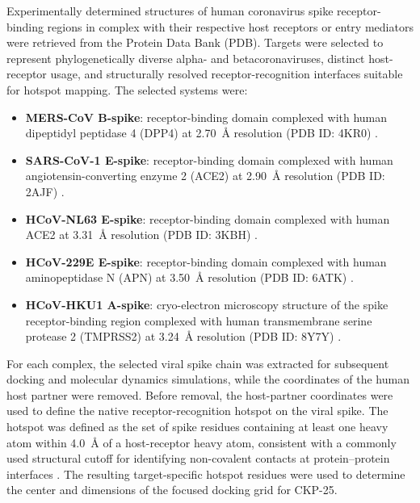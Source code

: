 \documentclass[pharmaceuticals,article,submit,pdftex,moreauthors]{Definitions/mdpi}
\begin{document}
Experimentally determined structures of human coronavirus spike receptor-binding regions in complex with their respective host receptors or entry mediators were retrieved from the Protein Data Bank (PDB). Targets were selected to represent phylogenetically diverse alpha- and betacoronaviruses, distinct host-receptor usage, and structurally resolved receptor-recognition interfaces suitable for hotspot mapping. The selected systems were:

\begin{itemize}
    \item \textbf{MERS-CoV B-spike}: receptor-binding domain complexed with human dipeptidyl peptidase 4 (DPP4) at 2.70~\AA{} resolution (PDB ID: 4KR0) \cite{lu2013molecular}.
    
    \item \textbf{SARS-CoV-1 E-spike}: receptor-binding domain complexed with human angiotensin-converting enzyme 2 (ACE2) at 2.90~\AA{} resolution (PDB ID: 2AJF) \cite{li2005structure}.
    
    \item \textbf{HCoV-NL63 E-spike}: receptor-binding domain complexed with human ACE2 at 3.31~\AA{} resolution (PDB ID: 3KBH) \cite{wu2009structure}.
    
    \item \textbf{HCoV-229E E-spike}: receptor-binding domain complexed with human aminopeptidase N (APN) at 3.50~\AA{} resolution (PDB ID: 6ATK) \cite{wong2017crystal}.
    
    \item \textbf{HCoV-HKU1 A-spike}: cryo-electron microscopy structure of the spike receptor-binding region complexed with human transmembrane serine protease 2 (TMPRSS2) at 3.24~\AA{} resolution (PDB ID: 8Y7Y) \cite{wang2024tmprss2}.
\end{itemize}

For each complex, the selected viral spike chain was extracted for subsequent docking and molecular dynamics simulations, while the coordinates of the human host partner were removed. Before removal, the host-partner coordinates were used to define the native receptor-recognition hotspot on the viral spike. The hotspot was defined as the set of spike residues containing at least one heavy atom within 4.0~\AA{} of a host-receptor heavy atom, consistent with a commonly used structural cutoff for identifying non-covalent contacts at protein--protein interfaces \cite{jiang2023sars}. The resulting target-specific hotspot residues were used to determine the center and dimensions of the focused docking grid for CKP-25.
\end{document}
